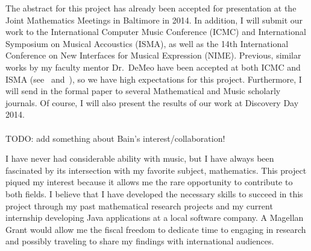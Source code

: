 \documentclass[10pt]{article}
\begin{document}
The abstract for this project has already been accepted for presentation at the
Joint Mathematics Meetings in Baltimore in 2014.  In addition, I will submit our
work to the International Computer Music Conference (ICMC) and International
Symposium on Musical Accoustics (ISMA), as well as the 14th International
Conference on New Interfaces for Musical Expression (NIME). Previous, similar
works by my faculty mentor Dr.~DeMeo have been accepted at both ICMC and ISMA
(see~\cite{nonabeliandsp} and~\cite{dissonance}), so we have high expectations
for this project. Furthermore, I will send in the formal paper to several
Mathematical and Music scholarly journals. Of course, I will also present the
results of our work at Discovery Day 2014.    \\
 \\
TODO: add something about Bain's interest/collaboration!

\vskip5mm

I have never had considerable ability with music, but I have always been
fascinated by its intersection with my favorite subject, mathematics.  This
project piqued my interest because it allows me the rare opportunity to
contribute to both fields.  I believe that I have developed the necessary skills
to succeed in this project through my past mathematical research projects and my
current internship developing Java applications at a local software company.  A
Magellan Grant would allow me the fiscal freedom to dedicate time to engaging in
research and possibly traveling to share my findings with international
audiences.  







\end{document}

